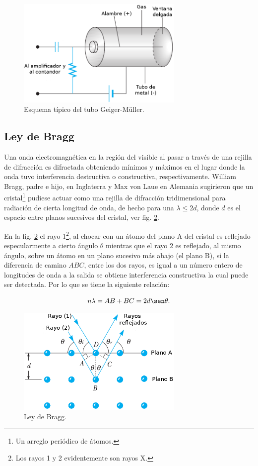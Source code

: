 \documentclass[letterpaper,10pt,twocolumn]{article}
\numberwithin{equation}{section}
\newcommand{\espaciocaps}{\setlength{\abovecaptionskip}{2pt}
  \setlength{\belowcaptionskip}{0pt}}
\begin{document}
\begin{figure}[H]
  \espaciocaps
  \centering
  \includegraphics[width=8cm]{geiger}
  \caption{Esquema típico del tubo Geiger-Müller.\cite{serway}}
  \label{fig:geiger}
\end{figure}

\subsection{Ley de Bragg}
\label{sec:bragg}

Una onda electromagnética en la región del visible al pasar a través de una rejilla de
difracción es difractada obteniendo mínimos y máximos en el lugar donde la onda tuvo
interferencia destructiva o constructiva, respectivamente. William Bragg, padre e hijo, en
Inglaterra y Max von Laue en Alemania sugirieron que un cristal\footnote{Un arreglo periódico
  de átomos.} pudiese actuar como una rejilla de difracción tridimensional para radiación de
cierta longitud de onda, de hecho para una $\lambda \le 2d$, donde $d$ es el espacio
entre planos sucesivos del cristal, ver fig. \ref{fig:bragg}.\cite{serway}

En la fig. \ref{fig:bragg} el rayo 1\footnote{Los rayos 1 y 2 evidentemente son rayos X.}, al
chocar con un átomo del plano A del cristal es reflejado especularmente a cierto ángulo
$\theta$ mientras que el rayo 2 es reflejado, al mismo ángulo, sobre un átomo en un plano
sucesivo más abajo (el plano B), si la diferencia de camino $ABC$, entre los dos rayos, es
igual a un número entero de longitudes de onda a la salida se obtiene interferencia
constructiva la cual puede ser detectada. Por lo que se tiene la siguiente
relación\cite{serway}: 

\begin{equation}
  \label{eq:bragg}
  n\lambda = AB + BC = 2d \sen\theta. 
\end{equation}

\begin{figure}[H]
  \espaciocaps
  \centering
  \includegraphics[width=8cm]{bragg}
  \caption{Ley de Bragg.\cite{serway}}
  \label{fig:bragg}
\end{figure}
\end{document}
